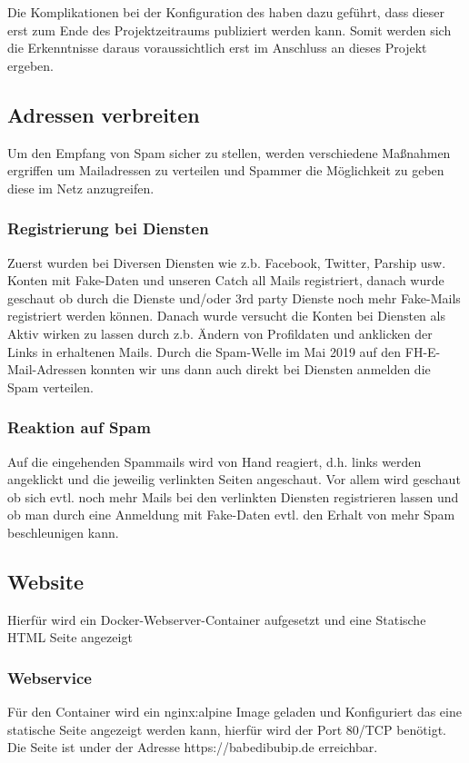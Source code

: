 \documentclass[a4paper,11pt,singlespacing]{article}
\begin{document}
			Die Komplikationen bei der Konfiguration des  haben dazu geführt, dass dieser erst zum Ende des Projektzeitraums publiziert werden kann. Somit werden sich die Erkenntnisse daraus voraussichtlich erst im Anschluss an dieses Projekt ergeben.


	\subsection{Adressen verbreiten}\label{sec:UmsetzungAdressenverbreiten}
		Um den Empfang von Spam sicher zu stellen, werden verschiedene Maßnahmen ergriffen um Mailadressen zu verteilen und Spammer die Möglichkeit zu geben diese im Netz anzugreifen.

		\subsubsection{Registrierung bei Diensten}\label{AdressenVerbreitenRegistrierenDiensten}
		Zuerst wurden bei Diversen Diensten wie z.b. Facebook, Twitter, Parship usw. Konten mit Fake-Daten und unseren Catch all Mails registriert, danach wurde geschaut ob durch die Dienste und/oder 3rd party Dienste noch mehr Fake-Mails registriert werden können. Danach wurde versucht die Konten bei Diensten als Aktiv wirken zu lassen durch z.b. Ändern von Profildaten und anklicken der Links in erhaltenen Mails. Durch die Spam-Welle im Mai 2019 auf den FH-E-Mail-Adressen konnten wir uns dann auch direkt bei Diensten anmelden die Spam verteilen.
		
		\subsubsection{Reaktion auf Spam}\label{AdressenVerbreitenReaktionSpam}
		Auf die eingehenden Spammails wird von Hand reagiert, d.h. links werden angeklickt und die jeweilig verlinkten Seiten angeschaut. Vor allem wird geschaut ob sich evtl. noch mehr Mails bei den verlinkten Diensten registrieren lassen und ob man durch eine Anmeldung mit Fake-Daten evtl. den Erhalt von mehr Spam beschleunigen kann.
	
	\subsection{Website}\label{sec:UmsetzungWebsite}
		Hierfür wird ein Docker-Webserver-Container aufgesetzt und eine Statische HTML Seite angezeigt
		\subsubsection{Webservice}\label{WebsiteWebservice}
			Für den Container wird ein nginx:alpine Image geladen und Konfiguriert das eine statische Seite angezeigt werden kann, hierfür wird der Port 80/TCP benötigt.
			Die Seite ist under der Adresse https://babedibubip.de erreichbar.
\end{document}
